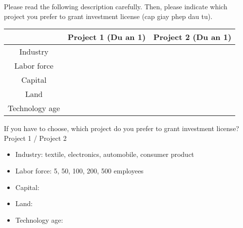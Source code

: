 Please read the following description carefully. Then, please indicate which project you prefer to grant investment license (cap giay phep dau tu).

\begin{center}
  \begin{tabular}{ c | c | c }
    \hline
     & Project 1 (Du an 1) & Project 2 (Du an 1) \\ \hline
    Industry &  &  \\ \hline
    Labor force &  &  \\ \hline
    Capital &  &  \\ \hline
    Land &  &  \\ \hline
    Technology age &  &  \\ \hline
    \hline
  \end{tabular}
\end{center}

If you have to choose, which project do you prefer to grant investment license? Project 1 / Project 2

\begin{itemize}
\item Industry: textile, electronics, automobile, consumer product
\item Labor force: 5, 50, 100, 200, 500 employees
\item Capital:
\item Land:
\item Technology age: 
\end{itemize}